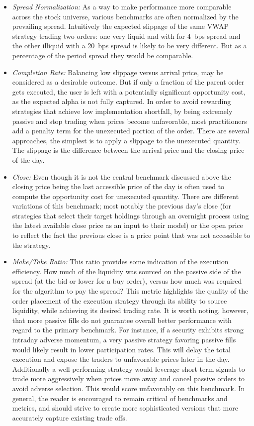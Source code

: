 \begin{itemize}
\item \emph{Spread Normalization:} As a way to make performance more  comparable across the stock universe, various benchmarks are often normalized by the prevailing spread. Intuitively the expected slippage of the same VWAP strategy trading two orders: one very liquid and with for 4~bps spread and the other illiquid with a 20~bps spread is likely to be very different. But as a percentage of the period spread they would be comparable. 

\item \emph{Completion Rate:} Balancing low slippage versus arrival price, may be considered as a desirable outcome. But if only a fraction of the parent order gets executed, the user is left with a potentially significant opportunity cost, as the expected alpha is not fully captured. In order to avoid rewarding strategies that achieve low implementation shortfall, by being extremely passive and stop trading when prices become unfavorable, most practitioners add a penalty term for the unexecuted portion of the order. There are several approaches, the simplest is to apply a slippage to the unexecuted quantity. The slippage is the difference between the arrival price and the closing price of the day. 

\item \emph{Close:} Even though it is not the central benchmark discussed above the closing price being the last accessible price of the day is often used to compute the opportunity cost for unexecuted quantity. There are different variations of this benchmark; most notably the previous day's close (for strategies that select their target holdings through an overnight process using the latest available close price as an input to their model) or the open price to reflect the fact the previous close is a price point that was not accessible to the strategy.

\item \emph{Make/Take Ratio:} This ratio provides some indication of the execution efficiency. How much of the liquidity was sourced on the passive side of the spread (at the bid or lower for a buy order), versus how much was required for the algorithm to pay the spread? This metric highlights the quality of the order placement of the execution strategy through its ability to source liquidity, while achieving its desired trading rate. It is worth noting, however, that more passive fills do not guarantee overall better performance with regard to the primary benchmark. For instance, if a security exhibits strong intraday adverse momentum, a very passive strategy favoring passive fills would likely result in lower participation rates. This will delay the total execution and expose the traders to unfavorable prices later in the day. Additionally a well-performing strategy would leverage short term signals to trade more aggressively when prices move away and cancel passive orders to avoid adverse selection. This would score unfavorably on this benchmark. In general, the reader is encouraged to remain critical of benchmarks and metrics, and should strive to create more sophisticated versions that more accurately capture existing trade offs.


\end{itemize}
